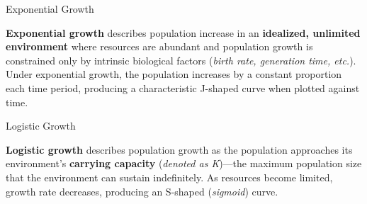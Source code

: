 \documentclass[10pt]{article}
\begin{document}
    \begin{core}{Exponential Growth}

      \textbf{Exponential growth} describes population increase in an \textbf{idealized, unlimited environment} where resources are abundant and population growth is constrained only by intrinsic biological factors (\textit{birth rate, generation time, etc.}). Under exponential growth, the population increases by a constant proportion each time period, producing a characteristic J-shaped curve when plotted against time.


    \end{core}

    \begin{core}{Logistic Growth}

      \textbf{Logistic growth} describes population growth as the population approaches its environment's \textbf{carrying capacity} (\textit{denoted as K})---the maximum population size that the environment can sustain indefinitely. As resources become limited, growth rate decreases, producing an S-shaped (\textit{sigmoid}) curve.


    \end{core}
\end{document}
